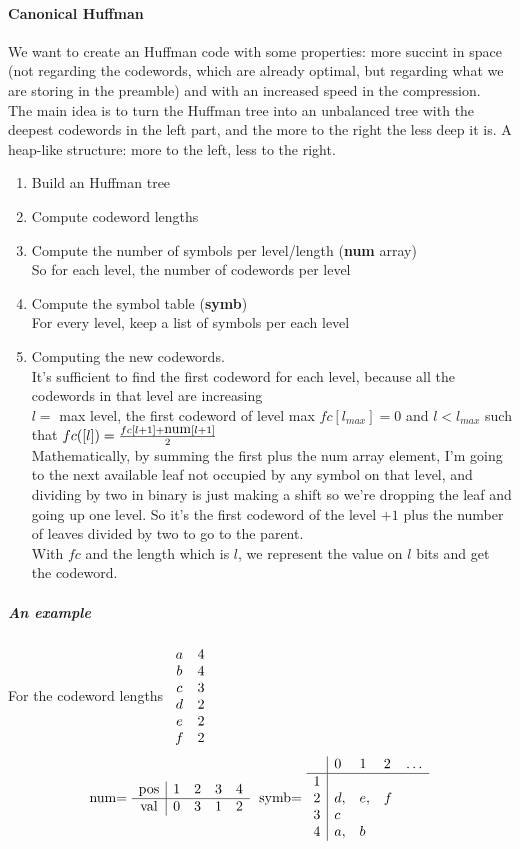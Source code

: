 \documentclass[10pt]{report}
\begin{document}
\paragraph{Canonical Huffman} We want to create an Huffman code with some properties: more succint in space (not regarding the codewords, which are already optimal, but regarding what we are storing in the preamble) and with an increased speed in the compression.\\
The main idea is to turn the Huffman tree into an unbalanced tree with the deepest codewords in the left part, and the more to the right the less deep it is. A heap-like structure: more to the left, less to the right.
\begin{enumerate}
	\item Build an Huffman tree 
	\item Compute codeword lengths
	\item Compute the number of symbols per level/length (\textbf{num} array)\\
	So for each level, the number of codewords per level
	\item Compute the symbol table (\textbf{symb})\\
	For every level, keep a list of symbols per each level
	\item Computing the new codewords.\\
	It's sufficient to find the first codeword for each level, because all the codewords in that level are increasing\\
	$l =$ max level, the first codeword of level max $fc[l_{max}] = 0$ and $l<l_{max}$ such that $fc([l])=\frac{fc[l+1]+\hbox{num}[l+1]}{2}$\\
	Mathematically, by summing the first plus the num array element, I'm going to the next available leaf not occupied by any symbol on that level, and dividing by two in binary is just making a shift so we're dropping the leaf and going up one level. So it's the first codeword of the level $+1$ plus the number of leaves divided by two to go to the parent.\\
	With $fc$ and the length which is $l$, we represent the value on $l$ bits and get the codeword.
\end{enumerate}
\subparagraph{An example} For the codeword lengths $\begin{array}{c c}
a & 4\\
b & 4\\
c & 3\\
d & 2\\
e & 2\\
f & 2
\end{array}$ $$\hbox{num= }\begin{array}{c| c c c c}
\hbox{pos}&1&2&3&4\\
\hline
\hbox{val}&0&3&1&2\\
\end{array}\:\:\:\hbox{symb= }\begin{array}{c| l l l l}
&0&1&2&\ldots\\
\hline
1&\\
2&d,&e,&f\\
3&c\\
4&a,&b
\end{array}$$
\end{document}
